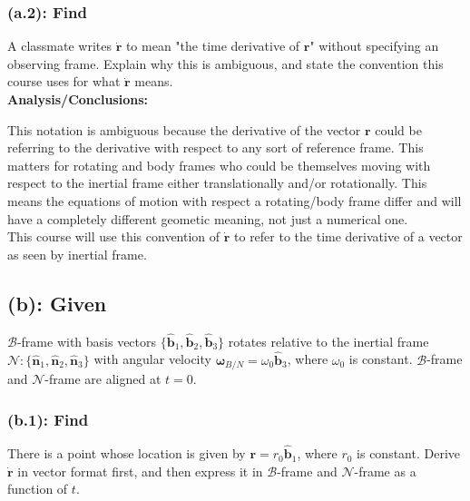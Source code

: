 \documentclass[titlepage]{article}
\begin{document}
\subsubsection*{(a.2): Find}
A classmate writes $\boldsymbol{\dot{r}}$ to mean "the time derivative of $\boldsymbol{r}$" without specifying an observing frame. Explain why this is ambiguous, and state the convention this course uses for what $\boldsymbol{\dot{r}}$ means.\\

\textbf{Analysis/Conclusions:}
\begin{mdframed}[linewidth=1pt, innertopmargin=10pt, innerbottommargin=10pt]
This notation is ambiguous because the derivative of the vector $\boldsymbol{r}$ could be referring to the derivative with respect to any sort of reference frame. This matters for rotating and body frames who could be themselves moving with respect to the inertial frame either translationally and/or rotationally. This means the equations of motion with respect a rotating/body frame differ and will have a completely different geometic meaning, not just a numerical one.\\

This course will use this convention of $\boldsymbol{\dot{r}}$ to refer to the time derivative of a vector as seen by inertial frame.
\end{mdframed}

\subsection*{(b): Given}
$\mathcal{B}$-frame with basis vectors $\{\boldsymbol{\hat{b}}_1,\boldsymbol{\hat{b}}_2,\boldsymbol{\hat{b}}_3\}$ rotates relative to the inertial frame $\mathcal{N}:\{\boldsymbol{\hat{n}}_1,\boldsymbol{\hat{n}}_2,\boldsymbol{\hat{n}}_3\}$ with angular velocity $\boldsymbol{\omega}_{B/N}=\omega_0\boldsymbol{\hat{b}}_3$, where $\omega_0$ is constant. $\mathcal{B}$-frame and $\mathcal{N}$-frame are aligned at $t=0$.

\subsubsection*{(b.1): Find}
There is a point whose location is given by $\boldsymbol{r}=r_0\boldsymbol{\hat{b}}_1$, where $r_0$ is constant. Derive $\boldsymbol{\dot{r}}$ in vector format first, and then express it in $\mathcal{B}$-frame and $\mathcal{N}$-frame as a function of $t$.\\
\end{document}
